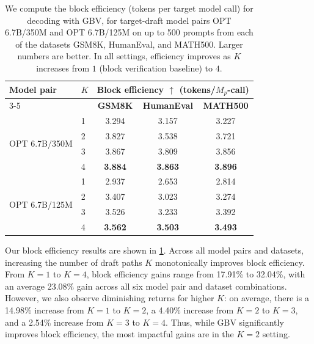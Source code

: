 \documentclass{article}
\theoremstyle{plain}
\theoremstyle{definition}
\theoremstyle{remark}
\begin{document}
\begin{table}[htbp]
\centering
\small
\setlength\tabcolsep{3pt}
\begin{tabular}{@{}llccc@{}}
\toprule
\textbf{Model pair} & \textbf{$K$} &
\multicolumn{3}{c}{\textbf{Block efficiency $\uparrow$} (tokens/$M_p$-call)} \\
\cmidrule(lr){3-5}
& & \textbf{GSM8K} & \textbf{HumanEval} & \textbf{MATH500} \\
\midrule
\multirow{4}{*}{OPT 6.7B/350M}
& 1 & 3.294 & 3.157 & 3.227 \\
& 2 & 3.827 & 3.538 & 3.721 \\
& 3 & 3.867 & 3.809 & 3.856 \\
& 4 & \textbf{3.884} & \textbf{3.863} & \textbf{3.896} \\
\midrule
\multirow{4}{*}{OPT 6.7B/125M}
& 1 & 2.937 & 2.653 & 2.814 \\
& 2 & 3.407 & 3.023 & 3.274 \\
& 3 & 3.526 & 3.233 & 3.392 \\
& 4 & \textbf{3.562} & \textbf{3.503} & \textbf{3.493} \\
\bottomrule
\end{tabular}
\caption{We compute the block efficiency (tokens per target model call) for decoding with GBV, for target-draft model pairs OPT 6.7B/350M and OPT 6.7B/125M on up to 500 prompts from each of the datasets GSM8K, HumanEval, and MATH500. Larger numbers are better. In all settings, efficiency improves as $K$ increases from $1$ (block verification baseline) to $4$.}
\label{tab:block-eff}
\end{table}


Our block efficiency results are shown in \cref{tab:block-eff}. Across all model pairs and datasets, increasing the number of draft paths $K$ monotonically improves block efficiency. From $K=1$ to $K=4$, block efficiency gains range from 17.91\% to 32.04\%, with an average 23.08\% gain across all six model pair and dataset combinations. However, we also observe diminishing returns for higher $K$: on average, there is a 14.98\% increase from $K=1$ to $K=2$, a 4.40\% increase from $K=2$ to $K=3$, and a 2.54\% increase from $K=3$ to $K=4$. Thus, while GBV significantly improves block efficiency, the most impactful gains are in the $K=2$ setting.
\end{document}
